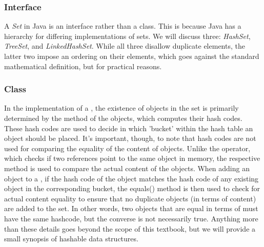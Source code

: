 \subsubsection*{ Interface}
A \emph{Set} in Java is an interface rather than a class. This is because Java has a hierarchy for differing implementations of sets. We will discuss three: \emph{HashSet}, \emph{TreeSet}, and \emph{LinkedHashSet}. While all three disallow duplicate elements, the latter two impose an ordering on their elements, which goes against the standard mathematical definition, but for practical reasons.

\subsubsection*{ Class}
In the implementation of a , the existence of objects in the set is primarily determined by the  method of the objects, which computes their hash codes. These hash codes are used to decide in which 'bucket' within the hash table an object should be placed. It's important, though, to note that hash codes are not used for comparing the equality of the content of objects. Unlike the \ttt{==} operator, which checks if two references point to the same object in memory, the respective  method is used to compare the actual content of the objects. When adding an object to a , if the hash code of the object matches the hash code of any existing object in the corresponding bucket, the equals() method is then used to check for actual content equality to ensure that no duplicate objects (in terms of content) are added to the set. In other words, two objects that are equal in terms of  must have the same hashcode, but the converse is not necessarily true. Anything more than these details goes beyond the scope of this textbook, but we will provide a small synopsis of hashable data structures.


